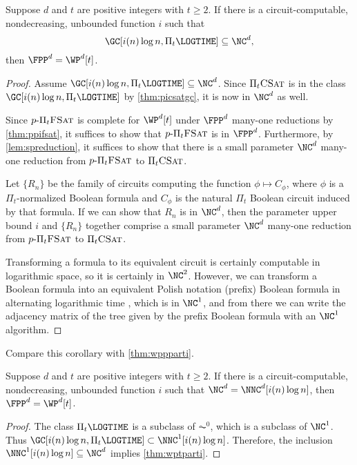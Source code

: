 \documentclass{article}
\newcommand{\dash}{\textnormal{-}}
\newcommand{\pPiFSAT}{p \dash \Pi_t \textsc{FSat}}
\newcommand{\PiCSAT}{\Pi_t \textsc{CSat}}
\begin{document}
\begin{theorem}\label{thm:wptparti}
  Suppose $d$ and $t$ are positive integers with $t \geq 2$.
  If there is a circuit-computable, nondecreasing, unbounded function $i$ such that
  \[
  \GC[i(n) \log n, \Pi_t \LOGTIME] \subseteq \NC^d,
  \]
  then $\FPP^d = \WP^d[t]$.
\end{theorem}
\begin{proof}
  Assume $\GC[i(n) \log n, \Pi_t \LOGTIME] \subseteq \NC^d$.
  Since $\PiCSAT$ is in the class $\GC[i(n) \log n, \Pi_t \LOGTIME]$ by \autoref{thm:picsatgc}, it is now in $\NC^d$ as well.

  Since $\pPiFSAT$ is complete for $\WP^d[t]$ under $\FPP^d$ many-one reductions by \autoref{thm:ppifsat}, it suffices to show that $\pPiFSAT$ is in $\FPP^d$.
  Furthermore, by \autoref{lem:spreduction}, it suffices to show that there is a small parameter $\NC^d$ many-one reduction from $\pPiFSAT$ to $\PiCSAT$.

  Let $\{R_n\}$ be the family of circuits computing the function $\phi \mapsto C_\phi$, where $\phi$ is a $\Pi_t$-normalized Boolean formula and $C_\phi$ is the natural $\Pi_t$ Boolean circuit induced by that formula.
  If we can show that $R_n$ is in $\NC^d$, then the parameter upper bound $i$ and $\{R_n\}$ together comprise a small parameter $\NC^d$ many-one reduction from $\pPiFSAT$ to $\PiCSAT$.

  Transforming a formula to its equivalent circuit is certainly computable in logarithmic space, so it is certainly in $\NC^2$.
  However, we can transform a Boolean formula into an equivalent Polish notation (prefix) Boolean formula in alternating logarithmic time \autocite{buss87}, which is in $\NC^1$, and from there we can write the adjacency matrix of the tree given by the prefix Boolean formula with an $\NC^1$ algorithm.
\end{proof}

Compare this corollary with \autoref{thm:wppparti}.

\begin{corollary}
  Suppose $d$ and $t$ are positive integers with $t \geq 2$.
  If there is a circuit-computable, nondecreasing, unbounded function $i$ such that $\NC^d = \NNC^d[i(n) \log n]$, then $\FPP^d = \WP^d[t]$.
\end{corollary}
\begin{proof}
  The class $\Pi_t \LOGTIME$ is a subclass of $\AC^0$, which is a subclass of $\NC^1$.
  Thus $\GC[i(n) \log n, \Pi_t \LOGTIME] \subset \NNC^1[i(n) \log n]$.
  Therefore, the inclusion $\NNC^1[i(n) \log n] \subseteq \NC^d$ implies \autoref{thm:wptparti}.
\end{proof}
\end{document}
